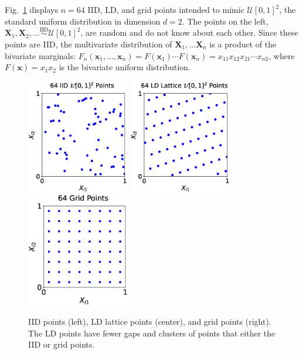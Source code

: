 \documentclass[11pt]{NSFamsart}
\newcommand{\bx}{{\boldsymbol{x}}}
\newcommand{\bX}{{\boldsymbol{X}}}
\newcommand{\calu}{{\mathcal{U}}}
\newcommand{\IIDSim}{\overset{\text{IID}}{\sim}}
\begin{document}
Fig.\ \ref{fig:iid_vs_ld} displays $n=64$ IID, LD, and grid points intended to mimic $\calu[0,1]^2$, the standard uniform distribution in dimension $d=2$.  The points on the left, $\bX_1, \bX_2,  \ldots \IIDSim \calu[0,1]^2$, are random and do not know about each other.  Since these points are IID, the multivariate distribution of $\bX_1, \ldots \bX_n$ is a product of the bivariate marginals:  $F_{n}(\bx_1, \ldots, \bx_n) = F(\bx_1) 
\cdots F(\bx_n) = x_{11}x_{12} x_{21} \cdots x_{n2}$, where $F(\bx)  = x_1x_2$ is the bivariate uniform distribution.

\begin{figure}[H]
	\centering
	\includegraphics[height = 5cm]{ProgramsImages/iid_scatter.eps} \quad
	\includegraphics[height = 5cm]{ProgramsImages/lattice_scatter.eps} \quad
	\includegraphics[height = 5cm]{ProgramsImages/grid_scatter.eps}
	\caption{IID points (left), LD lattice points (center), and grid points (right).  The LD points have fewer gaps and clusters of points that either the IID or grid points. \label{fig:iid_vs_ld}}
\end{figure}
\end{document}
